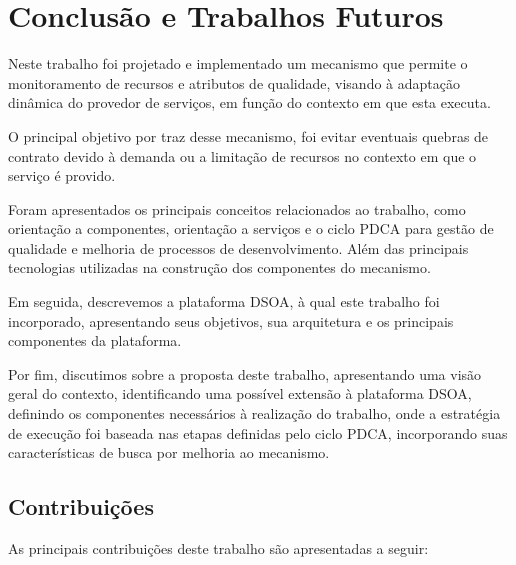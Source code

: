 \chapter{Conclusão e Trabalhos Futuros}
\label{ch:5}
Neste trabalho foi  projetado e implementado um mecanismo que permite o monitoramento de recursos e atributos de qualidade, visando à adaptação dinâmica do provedor de serviços, em função do contexto em que esta executa.

O principal objetivo por traz desse mecanismo, foi evitar eventuais quebras de contrato devido à demanda ou a limitação de recursos no contexto em que o serviço é provido.

Foram apresentados os principais conceitos relacionados ao trabalho, como orientação a componentes, orientação a serviços e o ciclo PDCA para gestão de qualidade e melhoria de processos de desenvolvimento. Além das principais tecnologias utilizadas na construção dos componentes do mecanismo.

Em seguida, descrevemos a plataforma DSOA, à qual este trabalho foi incorporado, apresentando seus objetivos, sua arquitetura e os principais componentes da plataforma. 

Por fim, discutimos sobre a proposta deste trabalho, apresentando uma visão geral do contexto, identificando uma possível extensão à plataforma DSOA, definindo os componentes necessários à realização do trabalho, onde a estratégia de execução foi baseada nas etapas definidas pelo ciclo PDCA, incorporando suas características de busca por melhoria ao mecanismo.

\section{Contribuições}

As principais contribuições deste trabalho são apresentadas a seguir:


